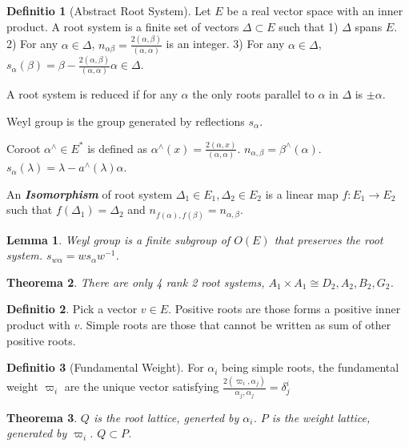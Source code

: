 \documentclass[12pt, a4paper]{article}
\newtheorem{theorem}{Theorema}[section]
\newtheorem{lemma}[theorem]{Lemma}
\theoremstyle{definition}
\newtheorem{definition}{Definitio}[section]
\theoremstyle{remark}
\renewcommand{\emph}[1]{\textbf{\textit{#1}}}
\begin{document}
\begin{definition}[Abstract Root System]
	Let $E$ be a real vector space with an inner product. 
	A root system is a finite set of vectors $\Delta \subset E$ such that 
	1) $\Delta$ spans $E$.
	2) For any $\alpha \in \Delta$, $n_{\alpha \beta} = \frac{2(\alpha, \beta)}{(\alpha, \alpha)}$ is an integer.
	3) For any $\alpha \in \Delta$, $s_{\alpha}(\beta) = \beta - \frac{2(\alpha, \beta)}{(\alpha, \alpha)}\alpha \in \Delta$.

	A root system is reduced if for any $\alpha$ the only roots parallel to $\alpha$ in $\Delta$ is $\pm \alpha$.

	Weyl group is the group generated by reflections $s_{\alpha}$.

	Coroot $\alpha ^{\wedge} \in E^{*}$ is defined as $\alpha^{\wedge}(x) = \frac{2(\alpha, x)}{(\alpha, \alpha)}$.
	$n_{\alpha,\beta}=\beta^{\wedge}(\alpha)$.
	$s_{\alpha}(\lambda) = \lambda - a^{\wedge}(\lambda)\alpha$.

	An \emph{Isomorphism} of root system $\Delta_{1} \in E_1, \Delta_2 \in E_2$ is a linear map $f: E_1 \rightarrow E_2$ such that $f(\Delta_1) = \Delta_2$ and $n_{f(\alpha), f(\beta)} = n_{\alpha, \beta}$.
\end{definition}

\begin{lemma}
Weyl group is a finite subgroup of $O(E)$ that preserves the root system. $s_{w{\alpha}} = ws_{\alpha}w^{-1}$.
\end{lemma}

\begin{theorem}
	There are only 4 rank 2 root systems, $A_1 \times A_1 \cong D_2, A_2, B_2, G_2$.
\end{theorem}

\begin{definition}
	Pick a vector $v \in E$. Positive roots are those forms a positive inner product with $v$. Simple roots are those that cannot be written as sum of other positive roots.
\end{definition}

\begin{definition}[Fundamental Weight]
	For $\alpha_i$ being simple roots, the fundamental weight $\varpi_i$ are the unique vector satisfying $\frac{2(\varpi_i, \alpha_j)}{\alpha_j, \alpha_j} = \delta^i_j$
\end{definition}

\begin{theorem}
	$Q$ is the root lattice, generted by $\alpha_i$. $P$ is the weight lattice, generated by $\varpi_i$.
	$Q\subset P$.
\end{theorem}
\end{document}
